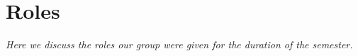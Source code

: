 \chapter{Roles} \label{ChapRoles}
\textit{Here we discuss the roles our group were given for the duration of the semester.}



